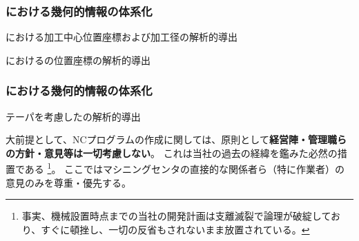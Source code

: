 \subsubsection{\CurvedOutcutMilling における幾何的情報の体系化}
\begin{enumerate}[label={\sarrow[red]}]
\item[\sarrow] \CurvedOutcut における加工中心位置座標および加工径の解析的導出
\item[\sarrow] \CurvedOutcut における\EndFace の位置座標の解析的導出
\end{enumerate}

\subsubsection{\InnerDiameter における幾何的情報の体系化}
\begin{enumerate}[label={\sarrow[red]}]
\item[\sarrow] テーパを考慮した\InnerDiameter の解析的導出
\end{enumerate}



\clearpage
\begin{marker}
大前提として、NCプログラムの作成に関しては、原則として\textbf{経営陣・管理職らの方針・意見等は一切考慮しない}。
\tcbline*
これは当社の過去の経緯を鑑みた必然の措置である
\footnote{事実、機械設置時点までの当社の開発計画は支離滅裂で論理が破綻しており、すぐに頓挫し、一切の反省もされないまま放置されている。}。
ここではマシニングセンタの直接的な関係者ら（特に作業者）の意見のみを尊重・優先する。
\end{marker}


